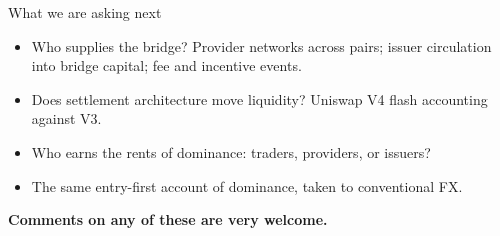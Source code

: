 \begin{frame}{What we are asking next}
\vspace{0.30cm}
\begin{itemize}
\item Who supplies the bridge? Provider networks across pairs; issuer circulation into bridge capital; fee and incentive events.
\item Does settlement architecture move liquidity? Uniswap V4 flash accounting against V3.
\item Who earns the rents of dominance: traders, providers, or issuers?
\item The same entry-first account of dominance, taken to conventional FX.
\end{itemize}
\vspace{0.34cm}
{\large\bfseries\color{ucldark}\centering Comments on any of these are very welcome.\par}
\end{frame}
